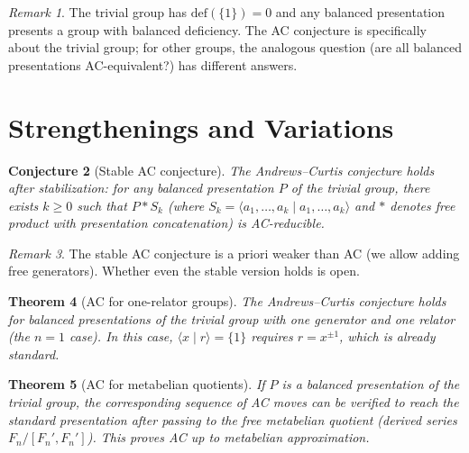 \documentclass[12pt,a4paper]{amsart}
\newtheorem{theorem}{Theorem}[section]
\newtheorem{conjecture}[theorem]{Conjecture}
\theoremstyle{definition}
\theoremstyle{remark}
\newtheorem{remark}[theorem]{Remark}
\begin{document}
\begin{remark}
The trivial group has $\mathrm{def}(\{1\}) = 0$ and any balanced presentation
presents a group with balanced deficiency. The AC conjecture is specifically
about the trivial group; for other groups, the analogous question (are all
balanced presentations AC-equivalent?) has different answers.
\end{remark}

\section{Strengthenings and Variations}

\begin{conjecture}[Stable AC conjecture]\label{conj:stableAC}
The Andrews--Curtis conjecture holds after \emph{stabilization}: for any balanced
presentation $P$ of the trivial group, there exists $k \geq 0$ such that
$P * S_k$ (where $S_k = \langle a_1,\ldots,a_k \mid a_1,\ldots,a_k \rangle$
and $*$ denotes free product with presentation concatenation) is AC-reducible.
\end{conjecture}

\begin{remark}
The stable AC conjecture is a priori weaker than AC (we allow adding free generators).
Whether even the stable version holds is open.
\end{remark}

\begin{theorem}[AC for one-relator groups]\label{thm:onerel}
The Andrews--Curtis conjecture holds for balanced presentations of the trivial group
with one generator and one relator (the $n=1$ case). In this case, $\langle x \mid r \rangle = \{1\}$
requires $r = x^{\pm 1}$, which is already standard.
\end{theorem}

\begin{theorem}[AC for metabelian quotients]\label{thm:metab}
If $P$ is a balanced presentation of the trivial group, the corresponding
sequence of AC moves can be verified to reach the standard presentation
after passing to the free metabelian quotient (derived series $F_n/[F_n',F_n']$).
This proves AC up to metabelian approximation.
\end{theorem}

\end{document}
